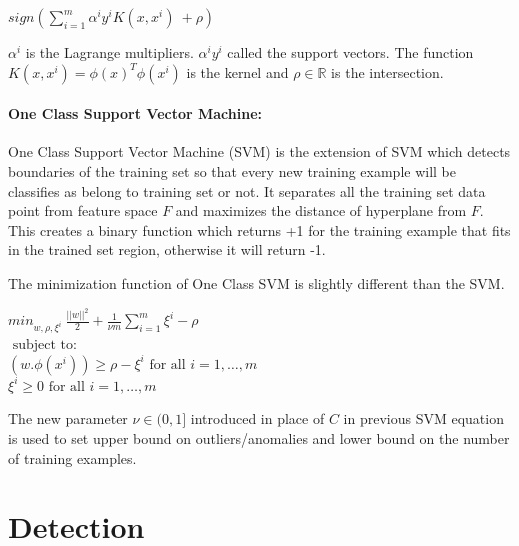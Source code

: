 \documentclass[12pt,oneside,a4paper]{article}
\begin{document}
\begin{center}
$sign(\sum_{i=1}^m \alpha^i y^i K(x,x^i) \ + \rho)$
\end{center}

$\alpha^i$ is the Lagrange multipliers. $\alpha^i y^i$ called the support vectors. The function $K(x,x^i)=\phi(x)^T \phi(x^i)$ is the kernel and $\rho \in \mathbb{R}$ is the intersection.

\paragraph{One Class Support Vector Machine:}

One Class Support Vector Machine (SVM) is the extension of SVM which detects boundaries of the training set so that every new training example will be classifies as belong to training set or not. It separates all the training set data point from feature space $F$ and maximizes the distance of hyperplane from $F$. This creates a binary function which returns +1 for the training example that fits in the trained set region, otherwise it will return -1.

The minimization function of One Class SVM is slightly different than the SVM. \cite{svm}

\begin{center}
  ${min}_{w,\rho,\xi^i} \ \frac{||w||^2}{2} + \frac{1}{\nu m} \sum_{i=1}^m \xi^i - \rho$ \\
  $\mbox{ subject to: }$ \\
  $(w.\phi(x^i)) \geq \rho - \xi^i \mbox{ for all } i = 1, \dots, m$ \\
  \hspace{2cm} $\xi^i \geq 0 \mbox{ for all } i = 1, \dots, m$ \\
\end{center}

The new parameter $\nu \in (0,1]$ introduced in place of $C$ in previous SVM equation is used to set upper bound on outliers/anomalies and lower bound on the number of training examples.

\section{Detection} \label{sec:Detection}
\end{document}
